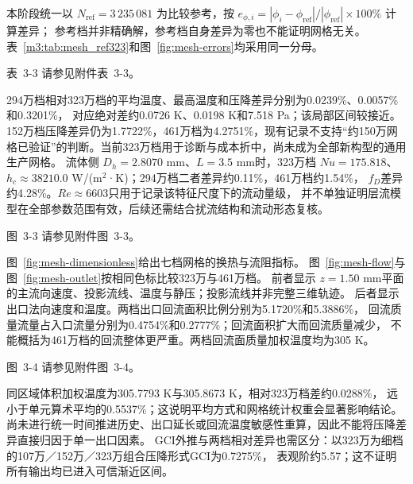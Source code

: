 \documentclass[UTF8]{midterm}
\makeatletter
\newcommand{\submissionnumber}[1]{\def\@currentlabel{#1}}
\makeatother
\begin{document}
本阶段统一以 $N_{\mathrm{ref}}=3\,235\,081$ 为比较参考，按
$e_{\phi,i}=|\phi_i-\phi_{\mathrm{ref}}|/|\phi_{\mathrm{ref}}|\times100\%$ 计算差异；
参考档并非精确解，参考档自身差异为零也不能证明网格无关。
表~\ref{m3:tab:mesh_ref323}和图~\ref{fig:mesh-errors}均采用同一分母。

\par\noindent \begingroup\submissionnumber{3-3}\label{m3:tab:mesh_ref323}\endgroup 表~3-3 请参见附件表~3-3。\par


294万档相对323万档的平均温度、最高温度和压降差异分别为0.0239\%、0.0057\%和0.3201\%，
对应绝对差约0.0726 K、0.0198 K和7.518 Pa；该局部区间较接近。
152万档压降差异仍为1.7722\%，461万档为4.2751\%，现有记录不支持“约150万网格已验证”的判断。当前323万档用于诊断与成本折中，尚未成为全部新构型的通用生产网格。
流体侧 $D_h=2.8070$ mm、$L=3.5$ mm时，323万档 $Nu=175.818$、
$h_c\approx38210.0$ W/(m$^2$·K)；294万档二者差异约0.11\%，461万档约1.54\%，
$f_D$差异约4.28\%。$Re\approx6603$只用于记录该特征尺度下的流动量级，
并不单独证明层流模型在全部参数范围有效，后续还需结合扰流结构和流动形态复核。


\par\noindent \begingroup\submissionnumber{3-3a}\label{fig:mesh-errors}\endgroup \begingroup\submissionnumber{3-3b}\label{fig:mesh-dimensionless}\endgroup 图~3-3 请参见附件图~3-3。\par


图~\ref{fig:mesh-dimensionless}给出七档网格的换热与流阻指标。
图~\ref{fig:mesh-flow}与图~\ref{fig:mesh-outlet}按相同色标比较323万与461万档。
前者显示 $z=1.50$ mm平面的主流向速度、投影流线、温度与静压；投影流线并非完整三维轨迹。
后者显示出口法向速度和温度。两档出口回流面积比例分别为5.1720\%和5.3886\%，
回流质量流量占入口流量分别为0.4754\%和0.2777\%；回流面积扩大而回流质量减少，
不能概括为461万档的回流整体更严重。两档回流面质量加权温度均为305 K。


\par\noindent \begingroup\submissionnumber{3-4a}\label{fig:mesh-flow}\endgroup \begingroup\submissionnumber{3-4b}\label{fig:mesh-outlet}\endgroup 图~3-4 请参见附件图~3-4。\par


同区域体积加权温度为305.7793 K与305.8673 K，相对323万档差约0.0288\%，
远小于单元算术平均的0.5537\%；这说明平均方式和网格统计权重会显著影响结论。
尚未进行统一时间推进历史、出口延长或回流温度敏感性重算，因此不能将压降差异直接归因于单一出口因素。
GCI外推与两档相对差异也需区分：以323万为细档的107万／152万／323万组合压降形式GCI为0.7275\%，
表观阶约5.57；这不证明所有输出均已进入可信渐近区间\cite{stagereports}。
\end{document}
